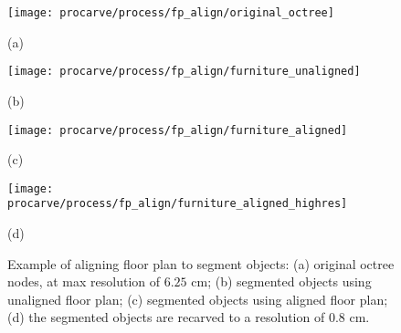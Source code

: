 \documentclass[12pt,onecolumn,oneside]{book}
\begin{document}
\begin{figure}[t]

	\begin{minipage}[t]{0.48\linewidth}
		\centerline{\texttt{[image: procarve/process/fp\_align/original\_octree]}}
		\centerline{(a)}
	\end{minipage}
	\hfill
	\begin{minipage}[t]{0.48\linewidth}
		\centerline{\texttt{[image: procarve/process/fp\_align/furniture\_unaligned]}}
		\centerline{(b)}
	\end{minipage}
	
	\begin{minipage}[t]{0.48\linewidth}
		\centerline{\texttt{[image: procarve/process/fp\_align/furniture\_aligned]}}
		\centerline{(c)}
	\end{minipage}
	\hfill
	\begin{minipage}[t]{0.48\linewidth}
		\centerline{\texttt{[image: procarve/process/fp\_align/furniture\_aligned\_highres]}}
		\centerline{(d)}
	\end{minipage}
	
	\caption[Aligning floor plans to octree geometry for object segmentation.]{Example of aligning floor plan to segment objects: (a) original octree nodes, at max resolution of $6.25$ cm; (b) segmented objects using unaligned floor plan; (c) segmented objects using aligned floor plan; (d) the segmented objects are recarved to a resolution of $0.8$ cm.}
	\label{fig:procarve_fp_align}
\end{figure}
\end{document}
